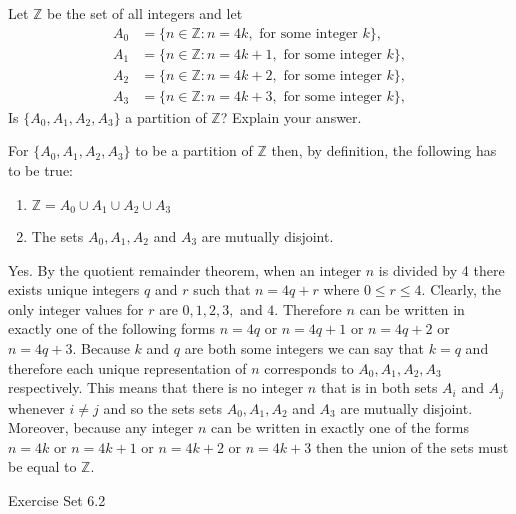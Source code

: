 \documentclass[12pt,letterpaper, onecolumn]{exam}
\begin{document}
\begin{questions}
\begin{solution}
	\end{solution}
	\setcounter{question}{29}\question Let $\mathbb{Z}$ be the set of all integers and let
	\begin{align*}
		A_0&=\{n\in\mathbb{Z}:n=4k, \text{ for some integer }k\},\\
		A_1&=\{n\in\mathbb{Z}:n=4k+1, \text{ for some integer }k\},\\
		A_2&=\{n\in\mathbb{Z}:n=4k+2, \text{ for some integer }k\},\\
		A_3&=\{n\in\mathbb{Z}:n=4k+3, \text{ for some integer }k\},
	\end{align*}
	Is $\{A_0,A_1,A_2,A_3\}$ a partition of $\mathbb{Z}$? Explain your answer.
	\begin{solution}
		For $\{A_0,A_1,A_2,A_3\}$ to be a partition of $\mathbb{Z}$ then, by definition, the following has to be true:
		\begin{enumerate}
			\item $\mathbb{Z}=A_0\cup A_1 \cup A_2 \cup A_3$
			\item The sets $A_0,A_1,A_2$ and $A_3$ are mutually disjoint.
			\end{enumerate}
			Yes. By the quotient remainder theorem, when an integer $n$ is divided by 4 there exists unique integers $q$ and $r$ such that $n=4q+r$ where $0\leq r \leq 4$. Clearly, the only integer values for $r$ are $0,1,2,3,$ and $4$. Therefore $n$ can be written in exactly one of the following forms $n=4q$ or $n=4q+1$ or $n=4q+2$ or $n=4q+3$. Because $k$ and $q$ are both some integers we can say that $k=q$ and therefore each unique representation of $n$ corresponds to $A_0, A_1, A_2, A_3$ respectively. This means that there is no integer $n$ that is in both sets $A_i$ and $A_j$ whenever $i\neq j$ and so the sets sets $A_0,A_1,A_2$ and $A_3$ are mutually disjoint.   Moreover, because any integer $n$ can be written in exactly one of the forms $n=4k$ or $n=4k+1$ or $n=4k+2$ or $n=4k+3$ then the union of the sets must be equal to $\mathbb{Z}$.
	\end{solution}
\end{questions}
	\centerline{Exercise Set 6.2}
\end{document}
